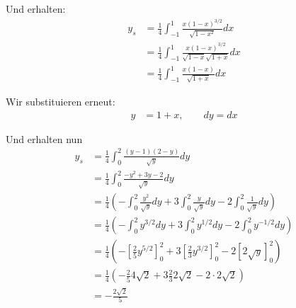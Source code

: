 \documentclass[a4paper,german,12pt,smallheadings]{scrartcl}
\begin{document}
\begin{enumerate}[a)]
    Und erhalten:
    \begin{align*}
      y_s &= \frac{1}{4} \int_{-1}^{1} \frac{x(1-x)^{3/2}}{\sqrt{1-x^2}} dx \\
          &= \frac{1}{4} \int_{-1}^{1} \frac{x(1-x)^{3/2}}{\sqrt{1-x}\sqrt{1+x}} dx \\
          &= \frac{1}{4} \int_{-1}^{1} \frac{x(1-x)}{\sqrt{1+x}} dx
    \end{align*}

    Wir substituieren erneut:
    \begin{align*}
      y &= 1+x, \qquad dy = dx
    \end{align*}

    Und erhalten nun
    \begin{align*}
      y_s &= \frac{1}{4} \int_{0}^{2} \frac{(y-1)(2-y)}{\sqrt{y}} dy \\
          &= \frac{1}{4} \int_{0}^{2} \frac{-y^2+3y-2}{\sqrt{y}} dy \\
          &= \frac{1}{4} \left(-\int_0^2 \frac{y^2}{\sqrt{y}} dy + 3 \int_0^2 \frac{y}{\sqrt{y}} dy - 2 \int_0^2 \frac{1}{\sqrt{y}} dy\right) \\
          &= \frac{1}{4} \left(-\int_0^2 y^{3/2} dy + 3 \int_0^2 y^{1/2} dy - 2 \int_0^2 y^{-1/2} dy\right) \\
          &= \frac{1}{4} \left(-\left[\frac{2}{5} y^{5/2}\right]_0^2 + 3 \left[\frac{2}{3} y^{3/2}\right]_0^2 - 2 \left[2\sqrt{y}\right]_0^2\right) \\
          &= \frac{1}{4} \left(-\frac{2}{5}4\sqrt{2} + 3 \frac{2}{3} 2 \sqrt{2} - 2 \cdot 2\sqrt{2}\right) \\
          &= - \frac{2\sqrt{2}}{5}
    \end{align*}



\end{enumerate}
\end{document}
